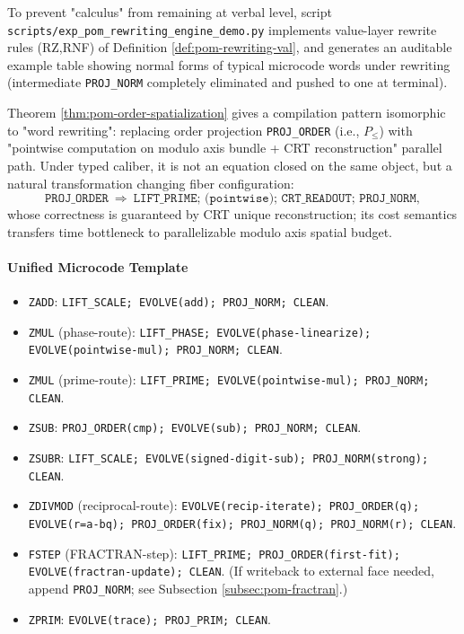 \begin{remark}\label{rem:pom-rewriting-engine-demo}
To prevent "calculus" from remaining at verbal level, script \texttt{scripts/exp\_pom\_rewriting\_engine\_demo.py} implements value-layer rewrite rules (RZ,RNF) of Definition \ref{def:pom-rewriting-val}, and generates an auditable example table showing normal forms of typical microcode words under rewriting (intermediate \texttt{PROJ\_NORM} completely eliminated and pushed to one at terminal).

\end{remark}

\begin{remark}\label{rem:pom-rewriting-order-spatialize}
Theorem \ref{thm:pom-order-spatialization} gives a compilation pattern isomorphic to "word rewriting": replacing order projection \texttt{PROJ\_ORDER} (i.e., \(P_{\le}\)) with "pointwise computation on modulo axis bundle + CRT reconstruction" parallel path.
Under typed caliber, it is not an equation closed on the same object, but a natural transformation changing fiber configuration:
\[
\texttt{PROJ\_ORDER}
\ \Longrightarrow\
\texttt{LIFT\_PRIME; (pointwise);\ CRT\_READOUT; PROJ\_NORM},
\]
whose correctness is guaranteed by CRT unique reconstruction; its cost semantics transfers time bottleneck to parallelizable modulo axis spatial budget.
\end{remark}

\paragraph{Unified Microcode Template}
\begin{itemize}
  \item \texttt{ZADD}: \texttt{LIFT\_SCALE; EVOLVE(add); PROJ\_NORM; CLEAN}.
  \item \texttt{ZMUL} (phase-route): \texttt{LIFT\_PHASE; EVOLVE(phase-linearize); EVOLVE(pointwise-mul); PROJ\_NORM; CLEAN}.
  \item \texttt{ZMUL} (prime-route): \texttt{LIFT\_PRIME; EVOLVE(pointwise-mul); PROJ\_NORM; CLEAN}.
  \item \texttt{ZSUB}: \texttt{PROJ\_ORDER(cmp); EVOLVE(sub); PROJ\_NORM; CLEAN}.
  \item \texttt{ZSUBR}: \texttt{LIFT\_SCALE; EVOLVE(signed-digit-sub); PROJ\_NORM(strong); CLEAN}.
  \item \texttt{ZDIVMOD} (reciprocal-route): \texttt{EVOLVE(recip-iterate); PROJ\_ORDER(q); EVOLVE(r=a-bq); PROJ\_ORDER(fix); PROJ\_NORM(q); PROJ\_NORM(r); CLEAN}.
  \item \texttt{FSTEP} (FRACTRAN-step): \texttt{LIFT\_PRIME; PROJ\_ORDER(first-fit); EVOLVE(fractran-update); CLEAN}. (If writeback to external face needed, append \texttt{PROJ\_NORM}; see Subsection \ref{subsec:pom-fractran}.)
  \item \texttt{ZPRIM}: \texttt{EVOLVE(trace); PROJ\_PRIM; CLEAN}.
\end{itemize}

